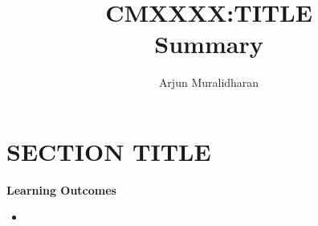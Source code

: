 \title{CMXXXX:TITLE \\ Summary}
\author{Arjun Muralidharan}



\section{SECTION TITLE}
\begin{mdframed}
\textbf{Learning Outcomes}
\begin{itemize}[label={\checkmark}]
\item
\end{itemize}
\end{mdframed}

\subsection{}




